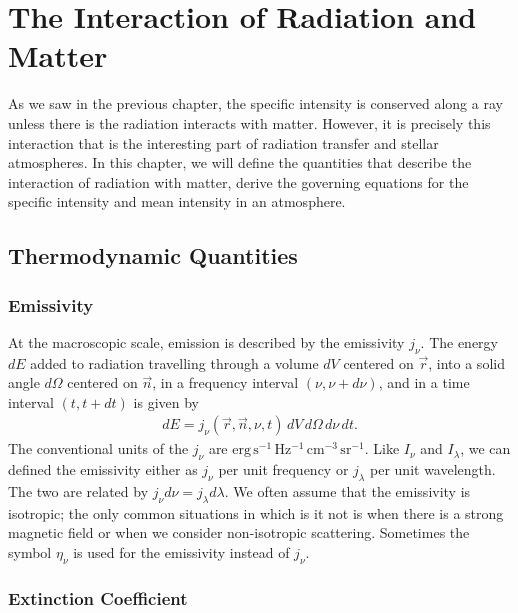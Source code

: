 
\chapter{The Interaction of Radiation and Matter}
\label{chapter:interaction}

\noindent
As we saw in the previous chapter, 
the specific intensity is conserved along a
ray unless there is the radiation interacts with matter.
However, it is precisely this interaction that is the
interesting part of radiation transfer and stellar
atmospheres. In this chapter, we will define the quantities that 
describe the interaction of radiation with matter, derive the 
governing equations for the specific intensity and mean intensity 
in an atmosphere.

\newslide

\section{Thermodynamic Quantities}

\subsection{Emissivity}

At the macroscopic scale, emission is described by the emissivity
$j_\nu$. The energy $dE$ added to radiation travelling through a volume
$dV$ centered on $\vec r$, into a solid angle $d\Omega$ centered on
$\vec n$, in a frequency interval $(\nu,\nu+d\nu)$, and in a time
interval $(t,t+dt)$ is given by
\begin{align}
dE = j_\nu(\vec r, \vec n, \nu, t)\,dV\,d\Omega\,d\nu\,dt.
\end{align}
The conventional units of the $j_\nu$ are
$\mathrm{erg\,s^{-1}\,Hz^{-1}\,cm^{-3}\,sr^{-1}}$. 
Like $I_\nu$ and $I_\lambda$, we can defined the emissivity either as $j_\nu$ per unit frequency or $j_\lambda$ per unit wavelength. The two are related by
$j_\nu d\nu = j_\lambda d\lambda$.
We often assume that
the emissivity is isotropic; the only common situations in which is it
not is when there is a strong magnetic field or when we consider
non-isotropic scattering.
Sometimes the symbol $\eta_\nu$
is used for the emissivity instead of $j_\nu$. 

\newslide

\subsection{Extinction Coefficient}

